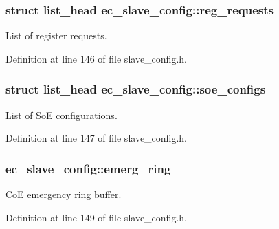 \subsubsection[{reg\-\_\-requests}]{\setlength{\rightskip}{0pt plus 5cm}struct list\-\_\-head {\bf ec\-\_\-slave\-\_\-config\-::reg\-\_\-requests}}\label{structec__slave__config_a391b64268ec07ce78e7aa50c9641e436}


\-List of register requests. 



\-Definition at line 146 of file slave\-\_\-config.\-h.

\subsubsection[{soe\-\_\-configs}]{\setlength{\rightskip}{0pt plus 5cm}struct list\-\_\-head {\bf ec\-\_\-slave\-\_\-config\-::soe\-\_\-configs}}\label{structec__slave__config_a9bfab1eba98284fcaa21079ea1700188}


\-List of \-So\-E configurations. 



\-Definition at line 147 of file slave\-\_\-config.\-h.

\subsubsection[{emerg\-\_\-ring}]{ {\bf ec\-\_\-slave\-\_\-config\-::emerg\-\_\-ring}}\label{structec__slave__config_a8a43523dca6d68508d858813f3d497a9}


\-Co\-E emergency ring buffer. 



\-Definition at line 149 of file slave\-\_\-config.\-h.

